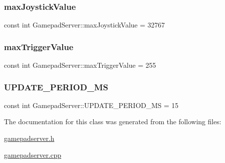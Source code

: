 \subsubsection{\texorpdfstring{max\+Joystick\+Value}{maxJoystickValue}}
{\footnotesize\ttfamily const int Gamepad\+Server\+::max\+Joystick\+Value = 32767\hspace{0.3cm}{\ttfamily [static]}}

\mbox{\label{class_gamepad_server_a55b784c3b441918f845d17630f1a6a1c}} 
\subsubsection{\texorpdfstring{max\+Trigger\+Value}{maxTriggerValue}}
{\footnotesize\ttfamily const int Gamepad\+Server\+::max\+Trigger\+Value = 255\hspace{0.3cm}{\ttfamily [static]}}

\mbox{\label{class_gamepad_server_afedf5e5e6725878a37509c496f1c8a16}} 
\subsubsection{\texorpdfstring{U\+P\+D\+A\+T\+E\+\_\+\+P\+E\+R\+I\+O\+D\+\_\+\+MS}{UPDATE\_PERIOD\_MS}}
{\footnotesize\ttfamily const int Gamepad\+Server\+::\+U\+P\+D\+A\+T\+E\+\_\+\+P\+E\+R\+I\+O\+D\+\_\+\+MS = 15}



The documentation for this class was generated from the following files\+:\begin{DoxyCompactItemize}
\item 
\mbox{\hyperlink{gamepadserver_8h}{gamepadserver.\+h}}\item 
\mbox{\hyperlink{gamepadserver_8cpp}{gamepadserver.\+cpp}}\end{DoxyCompactItemize}
